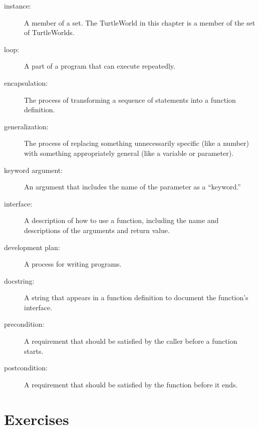 \documentclass[10pt]{book}
\begin{document}
\begin{description}

\item[instance:] A member of a set.  The TurtleWorld in this
chapter is a member of the set of TurtleWorlds.

\item[loop:] A part of a program that can execute repeatedly.

\item[encapsulation:] The process of transforming a sequence of
statements into a function definition.

\item[generalization:] The process of replacing something
unnecessarily specific (like a number) with something appropriately
general (like a variable or parameter).

\item[keyword argument:] An argument that includes the name of
the parameter as a ``keyword.''

\item[interface:] A description of how to use a function, including
the name and descriptions of the arguments and return value.

\item[development plan:] A process for writing programs.

\item[docstring:]  A string that appears in a function definition
to document the function's interface.

\item[precondition:] A requirement that should be satisfied by
the caller before a function starts.

\item[postcondition:] A requirement that should be satisfied by
the function before it ends.

\end{description}


\section{Exercises}
\end{document}
